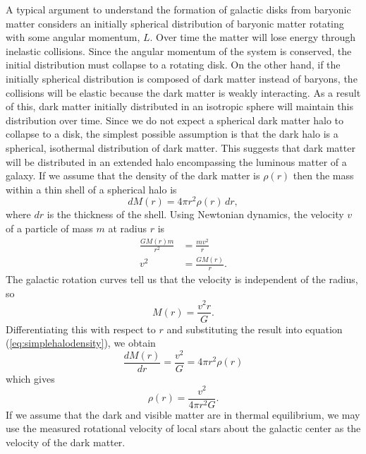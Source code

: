 A typical argument to understand the formation of galactic disks from baryonic
matter considers an initially spherical distribution of baryonic matter
rotating with some angular momentum, $L$. Over time the matter will lose
energy through inelastic collisions. Since the angular momentum of the system
is conserved, the initial distribution must collapse to a rotating disk.  On
the other hand, if the initially spherical distribution is composed of dark
matter instead of baryons, the collisions will be elastic because the dark
matter is weakly interacting. As a result of this, dark matter initially
distributed in an isotropic sphere will maintain this distribution over time.
Since we do not expect a spherical dark matter halo to collapse to a disk, the
simplest possible assumption is that the dark halo is a spherical, isothermal
distribution of dark matter. This suggests that dark matter will be
distributed in an extended halo encompassing the luminous matter of a galaxy.
If we assume that the density of the dark matter
is $\rho(r)$ then the mass within a thin shell of a spherical halo is
\begin{equation}
dM(r) = 4\pi r^2 \rho(r)\, dr,
\label{eq:simplehalodensity}
\end{equation}
where $dr$ is the thickness of the shell.
Using Newtonian dynamics, the velocity $v$ of a particle of mass $m$ at
radius $r$ is
\begin{equation}
\begin{split}
\frac{GM(r)m}{r^2} &= \frac{mv^2}{r} \\
v^2 &= \frac{GM(r)}{r}.
\end{split}
\end{equation}
The galactic rotation curves tell us that the velocity is independent of the
radius, so
\begin{equation}
M(r) = \frac{v^2r}{G}.
\end{equation}
Differentiating this with respect to $r$ and substituting the result into
equation (\ref{eq:simplehalodensity}), we obtain
\begin{equation}
\frac{dM(r)}{dr} = \frac{v^2}{G} = 4\pi r^2\rho(r)
\end{equation}
which gives
\begin{equation}
\rho(r) = \frac{v^2}{4\pi r^2 G}.
\label{eq:simplehalodensity2}
\end{equation}
If we assume that the dark and visible matter are in thermal equilibrium, we
may use the measured rotational velocity of local stars about the galactic
center as the velocity of the dark matter. 

